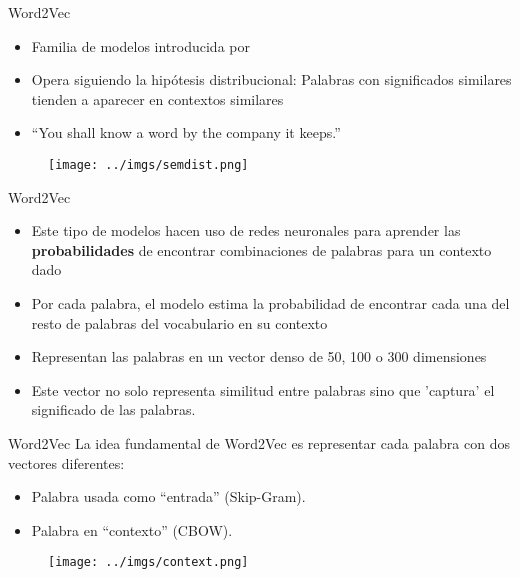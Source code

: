 \documentclass{beamer}
\begin{document}
\begin{frame}{Word2Vec}
\begin{itemize}
	\item Familia de modelos introducida por \cite{mikolov2013efficient}
	
	\item Opera siguiendo la hipótesis distribucional: Palabras con significados similares tienden a aparecer en contextos similares
	\item “You shall know a word by the company it keeps.” \cite{widdowson2007jr}
\end{itemize}
\begin{figure}
\centering
    \texttt{[image: ../imgs/semdist.png]}
\end{figure}
\end{frame}

\begin{frame}{Word2Vec}
\begin{itemize}
\item Este tipo de modelos hacen uso de redes neuronales para aprender las \textbf{probabilidades} de encontrar combinaciones de palabras para un contexto dado
	\item Por cada palabra, el modelo estima la probabilidad de encontrar cada una del resto de palabras del vocabulario en su contexto
	\item Representan las palabras en un vector denso de 50, 100 o 300 dimensiones
	\item Este vector no solo representa similitud entre palabras sino que 'captura' el significado de las palabras. 
\end{itemize}
\end{frame}


\begin{frame}{Word2Vec}
La idea fundamental de Word2Vec es representar cada palabra con dos vectores diferentes: 
\begin{itemize}
\item  Palabra usada como “entrada” (Skip-Gram). 
\item  Palabra en “contexto” (CBOW). 
\end{itemize}



  \begin{figure}
    \centering
    \texttt{[image: ../imgs/context.png]} %
    
  \end{figure}
\end{frame}
\end{document}
